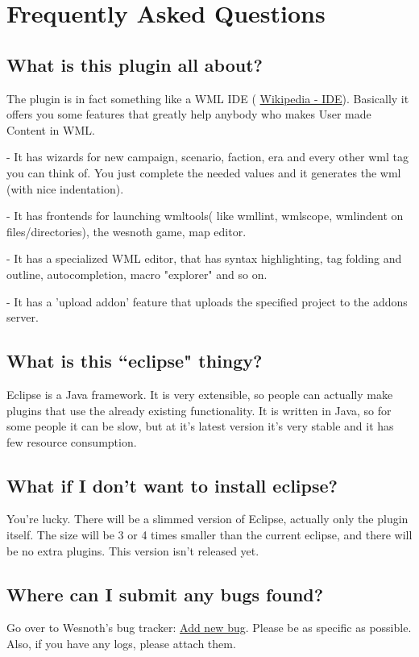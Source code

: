 \documentclass[10pt]{article}
\begin{document}
\section{Frequently Asked Questions}
\subsection{What is this plugin all about?}
The plugin is in fact something like a WML IDE ( \href{http://en.wikipedia.org/wiki/Integrated_development_environment}{Wikipedia - IDE}). Basically it offers you some features that greatly help anybody who makes User made Content in WML.
\begin{description}
\item- It has wizards for new campaign, scenario, faction, era and every other wml tag you can think of. You just complete the needed values and it generates the wml (with nice indentation).
\item- It has frontends for launching wmltools( like wmllint, wmlscope, wmlindent on files/directories), the wesnoth game, map editor.
\item- It has a specialized WML editor, that has syntax highlighting, tag folding and outline, autocompletion, macro "explorer" and so on.
\item- It has a 'upload addon' feature that uploads the specified project to the addons server.
\end{description}

\subsection{What is this ``eclipse" thingy?}
Eclipse is a Java framework. It is very extensible, so people can actually make plugins that use the already existing functionality. It is written in Java, so for some people it can be slow, but at it's latest version it's very stable and it has few resource consumption.

\subsection{What if I don't want to install eclipse?}
You're lucky. There will be a slimmed version of Eclipse, actually only the plugin itself. The size will be 3 or 4 times smaller than the current eclipse, and there will be no extra plugins. This version isn't released yet.

\subsection{Where can I submit any bugs found?}
Go over to Wesnoth's bug tracker: \href{https://gna.org/bugs/?func=additem&group=wesnoth&bug_group_id=116}{Add new bug}. Please be as specific as possible. Also, if you have any logs, please attach them.
\end{document}
